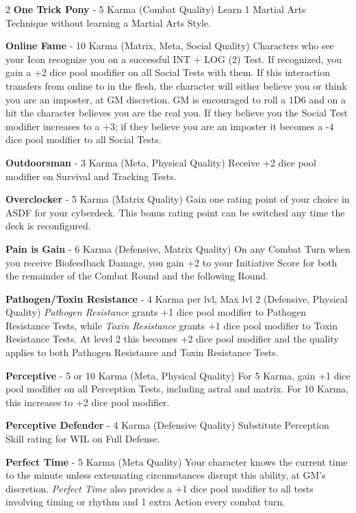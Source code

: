 \documentclass[
  oneside]{article}
\begin{document}
\begin{multicols}{2}
\textbf{One Trick Pony} - 5 Karma (Combat Quality)
Learn 1 Martial Arts Technique without learning a
Martial Arts Style.

\textbf{Online Fame} - 10 Karma (Matrix, Meta,
Social Quality) Characters who see your Icon
recognize you on a successful INT + LOG (2) Test.
If recognized, you gain a +2 dice pool modifier on
all Social Tests with them. If this interaction
transfers from online to in the flesh, the
character will either believe you or think you are
an imposter, at GM discretion. GM is encouraged to
roll a 1D6 and on a hit the character believes you
are the real you. If they believe you the Social
Test modifier increases to a +3; if they believe
you are an imposter it becomes a -4 dice pool
modifier to all Social Tests.

\textbf{Outdoorsman} - 3 Karma (Meta, Physical
Quality) Receive +2 dice pool modifier on Survival
and Tracking Tests.

\textbf{Overclocker} - 5 Karma (Matrix Quality)
Gain one rating point of your choice in ASDF for
your cyberdeck. This bonus rating point can be
switched any time the deck is reconfigured.

\textbf{Pain is Gain} - 6 Karma (Defensive, Matrix
Quality) On any Combat Turn when you receive
Biofeedback Damage, you gain +2 to your Initiative
Score for both the remainder of the Combat Round
and the following Round.

\textbf{Pathogen/Toxin Resistance} - 4 Karma per
lvl, Max lvl 2 (Defensive, Physical Quality)
\emph{Pathogen Resistance} grants +1 dice pool
modifier to Pathogen Resistance Tests, while
\emph{Toxin Resistance} grants +1 dice pool
modifier to Toxin Resistance Tests. At level 2
this becomes +2 dice pool modifier and the quality
applies to both Pathogen Resistance and Toxin
Resistance Tests.

\textbf{Perceptive} - 5 or 10 Karma (Meta,
Physical Quality) For 5 Karma, gain +1 dice pool
modifier on all Perception Tests, including astral
and matrix. For 10 Karma, this increases to +2
dice pool modifier.

\textbf{Perceptive Defender} - 4 Karma (Defensive
Quality) Substitute Perception Skill rating for
WIL on Full Defense.

\textbf{Perfect Time} - 5 Karma (Meta Quality)
Your character knows the current time to the
minute unless extenuating circumstances disrupt
this ability, at GM's discretion. \emph{Perfect
Time} also provides a +1 dice pool modifier to all
tests involving timing or rhythm and 1 extra
Action every combat turn.


\end{multicols}
\end{document}
